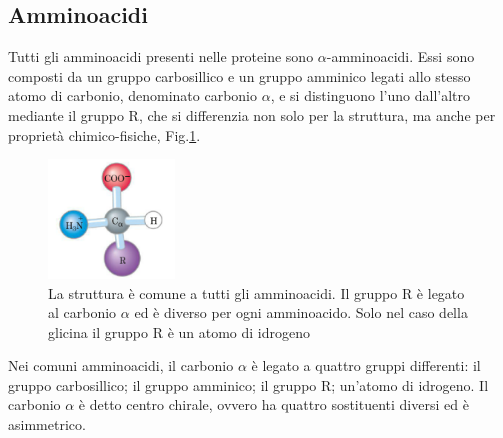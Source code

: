 \subsection{Amminoacidi}\label{subsec:amminoacido}
Tutti gli amminoacidi presenti nelle proteine sono $\alpha$-amminoacidi. Essi sono composti da un gruppo carbosillico e un gruppo amminico legati allo stesso atomo di carbonio, denominato carbonio $\alpha$, e si distinguono l'uno dall'altro mediante il gruppo R, che si differenzia non solo per la struttura, ma anche per proprietà chimico-fisiche, Fig.\ref{fig:Amminoacido}. 
\begin{figure}
	\centering
	\includegraphics[width=0.3\textwidth]{Immagini/StrutturaAmminoacido.png}
	\caption{La struttura è comune a tutti gli amminoacidi. Il gruppo R è legato al carbonio $\alpha$ ed è diverso per ogni amminoacido. Solo nel caso della glicina il gruppo R è un atomo di idrogeno}
	\label{fig:Amminoacido}
\end{figure}

Nei comuni amminoacidi, il carbonio $\alpha$ è legato a quattro gruppi differenti: il gruppo carbosillico; il gruppo amminico; il gruppo R; un'atomo di idrogeno. Il carbonio $\alpha$ è detto centro chirale, ovvero ha quattro sostituenti diversi ed è asimmetrico. 


